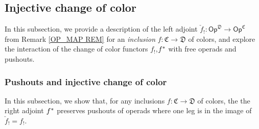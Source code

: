 \documentclass[a4paper,10pt
,draft
]{article}%
\numberwithin{equation}{section}
\numberwithin{figure}{section}
\theoremstyle{definition} %
\newcommand{\Op}{\mathsf{Op}}%
\newcommand{\1}{\ensuremath{\mathbbm 1}}%
\begin{document}
\subsection{Injective change of color}

In this subsection, we provide a description of the left adjoint $\check f_! \colon \Op^{\mathfrak D} \to \Op^{\mathfrak C}$
from Remark \ref{OP_MAP REM}
for an \textit{inclusion} $f \colon \mathfrak C \to \mathfrak D$ of colors,
and explore the interaction of the change of color functors $f_!$,$f^{\**}$ with free operads and pushouts.









\subsubsection{Pushouts and injective change of color}

In this subsection, we show that, for any inclusions $f \colon \mathfrak C \to \mathfrak D$ of colors,
the the right adjoint $f^{\**}$ preserves pushouts of operads where one leg is in the image of $\check f_! = f_!$.
\end{document}
